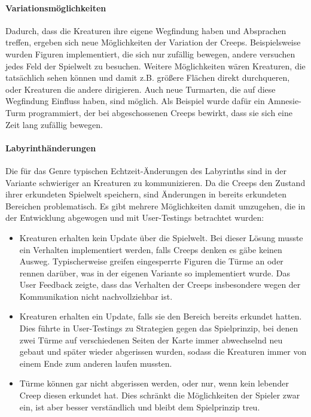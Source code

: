 \paragraph{Variationsmöglichkeiten} Dadurch, dass die Kreaturen ihre eigene Wegfindung haben und Absprachen treffen, ergeben sich neue Möglichkeiten der Variation der Creeps. Beispielsweise wurden Figuren implementiert, die sich nur zufällig bewegen, andere versuchen jedes Feld der Spielwelt zu besuchen. Weitere Möglichkeiten wären Kreaturen, die tatsächlich sehen können und damit z.B. größere Flächen direkt durchqueren, oder Kreaturen die andere dirigieren. Auch neue Turmarten, die auf diese Wegfindung Einfluss haben, sind möglich. Als Beispiel wurde dafür ein Amnesie-Turm programmiert, der bei abgeschossenen Creeps bewirkt, dass sie sich eine Zeit lang zufällig bewegen.

\paragraph{Labyrinthänderungen} Die für das Genre typischen Echtzeit-Änderungen des Labyrinths sind in der Variante schwieriger an Kreaturen zu kommunizieren. Da die Creeps den Zustand ihrer erkundeten Spielwelt speichern, sind Änderungen in bereits erkundeten Bereichen problematisch. Es gibt mehrere Möglichkeiten damit umzugehen, die in der Entwicklung abgewogen und mit User-Testings betrachtet wurden:
\begin{itemize}
	\item Kreaturen erhalten kein Update über die Spielwelt. Bei dieser Lösung musste ein Verhalten implementiert werden, falls Creeps denken es gäbe keinen Ausweg. Typischerweise greifen eingesperrte Figuren die Türme an oder rennen darüber, was in der eigenen Variante so implementiert wurde. Das User Feedback zeigte, dass das Verhalten der Creeps insbesondere wegen der Kommunikation nicht nachvollziehbar ist.
	\item Kreaturen erhalten ein Update, falls sie den Bereich bereits erkundet hatten. Dies führte in User-Testings zu Strategien gegen das Spielprinzip, bei denen zwei Türme auf verschiedenen Seiten der Karte immer abwechselnd neu gebaut und später wieder abgerissen wurden, sodass die Kreaturen immer von einem Ende zum anderen laufen mussten.
	\item Türme können gar nicht abgerissen werden, oder nur, wenn kein lebender Creep diesen erkundet hat. Dies schränkt die Möglichkeiten der Spieler zwar ein, ist aber besser verständlich und bleibt dem Spielprinzip treu.
\end{itemize}

